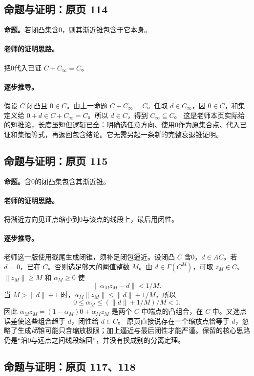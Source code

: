 \subsection{命题与证明：原页 114}

\textbf{命题。}若闭凸集含0，则其渐近锥包含于它本身。

\paragraph{老师的证明思路。}把0代入已证 $C+C_\infty=C$。

\paragraph{逐步推导。}
假设 $C$ 闭凸且 $0\in C$。由上一命题 $C+C_\infty=C$。任取 $d\in C_\infty$，因 $0\in C$，和集定义给 $0+d\in C+C_\infty=C$。所以 $d\in C$，得到 $C_\infty\subseteq C$。
这是老师本页实际给的短推论，长度虽短但逻辑已全：明确选任意方向、使用0作为原集合点、代入已证和集恒等式，再返回包含结论。它无需另起一条新的完整衰退锥证明。


\subsection{命题与证明：原页 115}

\textbf{命题。}含0的闭凸集包含其渐近锥。

\paragraph{老师的证明思路。}将渐近方向见证点缩小到0与该点的线段上，最后用闭性。

\paragraph{逐步推导。}
老师这一版使用截尾生成闭锥，须补足闭包逼近。设闭凸 $C$ 含0，$d\in AC$。若 $d=0$，已在 $C$。否则选足够大的阈值整数 $M$。由 $d\in\Gamma(C^M)$，可取 $z_M\in C$、$\|z_M\|\ge M$ 和 $\alpha_M\ge0$ 使
\[\|\alpha_Mz_M-d\|<1/M.\]
当 $M>\|d\|+1$ 时，$\alpha_M\|z_M\|\le\|d\|+1/M$，所以
\[0\le\alpha_M\le(\|d\|+1/M)/M<1.\]
因此 $\alpha_Mz_M=(1-\alpha_M)0+\alpha_Mz_M$ 是两个 $C$ 中端点的凸组合，在 $C$ 中。又选点误差使这些组合趋于 $d$，闭性给 $d\in C$。
原页直接说存在一个缩放点恰等于 $d$，忽略了生成\emph{闭}锥可能只含缩放极限；加上逼近与最后闭性才能严谨。保留的核心思路仍是“沿0与远点之间线段缩回”，并没有换成别的分离定理。


\subsection{命题与证明：原页 117、118}

